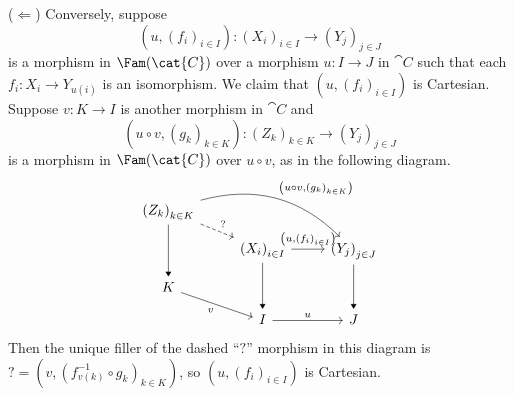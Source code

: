 \begin{solution}
(\(\Longleftarrow\))
Conversely, suppose
\begin{equation*}
\left(u,\left(f_i\right)_{i \in I}\right) : \left(X_i\right)_{i \in I} \to \left(Y_j\right)_{j \in J}
\end{equation*}
is a morphism in \(\Fam(\cat{C})\) over a morphism \(u : I \to J\) in \(\cat{C}\) such that each \(f_i : X_i \to Y_{u(i)}\) is an isomorphism.
We claim that \(\left(u,\left(f_i\right)_{i \in I}\right)\) is Cartesian.
Suppose \(v : K \to I\) is another morphism in \(\cat{C}\) and
\begin{equation*}
\left(u \circ v, \left(g_k\right)_{k \in K}\right) : \left(Z_k\right)_{k \in K} \to \left(Y_j\right)_{j \in J}
\end{equation*}
is a morphism in \(\Fam(\cat{C})\) over \(u \circ v\), as in the following diagram.
\begin{equation*}
\begin{tikzcd}[row sep=small]
\left(Z_k\right)_{k \in K} \arrow[rrd, bend left, "{\left(u \circ v, \left(g_k\right)_{k \in K}\right)}"] \arrow[dr, dashed, "?"] \arrow[dd, -Triangle] \\
& \left(X_i\right)_{i \in I} \arrow[r, "{\left(u, \left(f_i\right)_{i \in I}\right)}"] \arrow[dd, -Triangle]
& \left(Y_j\right)_{j \in J} \arrow[dd, -Triangle] \\
K \arrow[dr, "v"{below left}]\\
& I \arrow[r, "u"]
& J
\end{tikzcd}
\end{equation*}
Then the unique filler of the dashed ``\(?\)'' morphism in this diagram is \(? = \left(v, \left(f_{v(k)}^{-1} \circ g_k\right)_{k \in K}\right)\), so \(\left(u,\left(f_i\right)_{i \in I}\right)\) is Cartesian.
\end{solution}